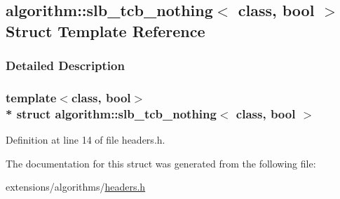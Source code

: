 \hypertarget{structalgorithm_1_1slb__tcb__nothing}{}\subsection{algorithm\+:\+:slb\+\_\+tcb\+\_\+nothing$<$ class, bool $>$ Struct Template Reference}
\label{structalgorithm_1_1slb__tcb__nothing}


\subsubsection{Detailed Description}
\subsubsection*{template$<$class, bool$>$\\*
struct algorithm\+::slb\+\_\+tcb\+\_\+nothing$<$ class, bool $>$}



Definition at line 14 of file headers.\+h.



The documentation for this struct was generated from the following file\+:\begin{DoxyCompactItemize}
\item 
extensions/algorithms/\hyperlink{extensions_2algorithms_2headers_8h}{headers.\+h}\end{DoxyCompactItemize}
